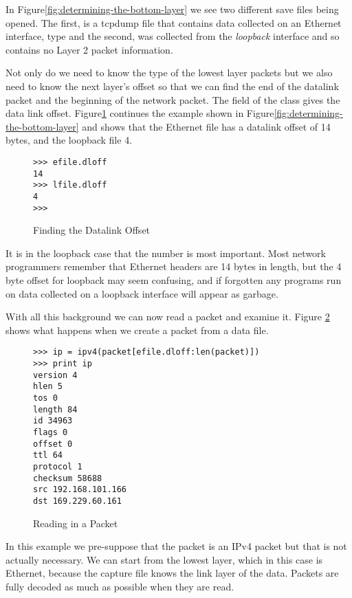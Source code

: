 \documentclass[11pt]{article}
\begin{document}
In Figure\ref{fig:determining-the-bottom-layer} we see two different
save files being opened.  The first,  is a tcpdump
file that contains data collected on an Ethernet interface, type
 and the second,  was collected
from the \emph{loopback} interface and so contains no Layer 2 packet
information.  

Not only do we need to know the type of the lowest layer packets but
we also need to know the next layer's offset so that we can find the
end of the datalink packet and the beginning of the network packet.
The  field of the  class gives the data link
offset.  Figure\ref{fig:finding-the-datalink-offset} continues the
example shown in Figure\ref{fig:determining-the-bottom-layer} and
shows that the Ethernet file has a datalink offset of 14 bytes, and
the loopback file 4. 

  \begin{figure}
    \centering
\begin{verbatim}
>>> efile.dloff
14
>>> lfile.dloff
4
>>> 
\end{verbatim}
    \caption{Finding the Datalink Offset}
    \label{fig:finding-the-datalink-offset}
  \end{figure}

It is in the loopback case that the number is most important.  Most
network programmers remember that Ethernet headers are 14 bytes in
length, but the 4 byte offset for loopback may seem confusing, and if
forgotten any programs run on data collected on a loopback interface
will appear as garbage.

With all this background we can now read a packet and examine it.
Figure \ref{fig:reading-in-a-packet} shows what happens when we create
a packet from a data file.  

\begin{figure}
  \centering
\begin{verbatim}
>>> ip = ipv4(packet[efile.dloff:len(packet)])
>>> print ip
version 4
hlen 5
tos 0
length 84
id 34963
flags 0
offset 0
ttl 64
protocol 1
checksum 58688
src 192.168.101.166
dst 169.229.60.161
\end{verbatim}
  \caption{Reading in a Packet}
  \label{fig:reading-in-a-packet}
\end{figure}

In this example we pre-suppose that the packet is an IPv4 packet but
that is not actually necessary.  We can start from the lowest layer,
which in this case is Ethernet, because the capture file knows the
link layer of the data.  Packets are fully decoded as much as possible
when they are read.  
\end{document}
